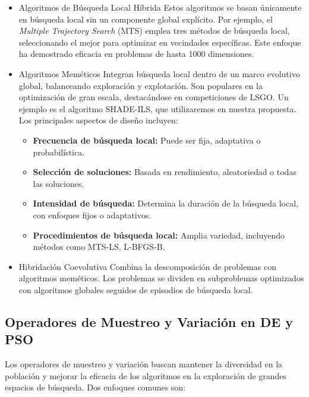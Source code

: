 \begin{itemize}
\item{Algoritmos de Búsqueda Local Híbrida}
Estos algoritmos se basan únicamente en búsqueda local sin un componente global explícito. Por ejemplo, el \textit{Multiple Trajectory Search} (MTS) emplea tres métodos de búsqueda local, seleccionando el mejor para optimizar en vecindades específicas. Este enfoque ha demostrado eficacia en problemas de hasta 1000 dimensiones.

\item{Algoritmos Meméticos}
Integran búsqueda local dentro de un marco evolutivo global, balanceando exploración y explotación. Son populares en la optimización de gran escala, destacándose en competiciones de LSGO. Un ejemplo es el algoritmo SHADE-ILS, que utilizaremos en nuestra propuesta. Los principales aspectos de diseño incluyen:
\begin{itemize}
    \item \textbf{Frecuencia de búsqueda local:} Puede ser fija, adaptativa o probabilística.
    \item \textbf{Selección de soluciones:} Basada en rendimiento, aleatoriedad o todas las soluciones.
    \item \textbf{Intensidad de búsqueda:} Determina la duración de la búsqueda local, con enfoques fijos o adaptativos.
    \item \textbf{Procedimientos de búsqueda local:} Amplia variedad, incluyendo métodos como MTS-LS, L-BFGS-B.
\end{itemize}

\item{Hibridación Coevolutiva}
Combina la descomposición de problemas con algoritmos meméticos. Los problemas se dividen en subproblemas optimizados con algoritmos globales seguidos de episodios de búsqueda local. 
\end{itemize}

\subsection{Operadores de Muestreo y Variación en DE y PSO}

Los operadores de muestreo y variación buscan mantener la diversidad en la población y mejorar la eficacia de los algoritmos en la exploración de grandes espacios de búsqueda. Dos enfoques comunes son:


